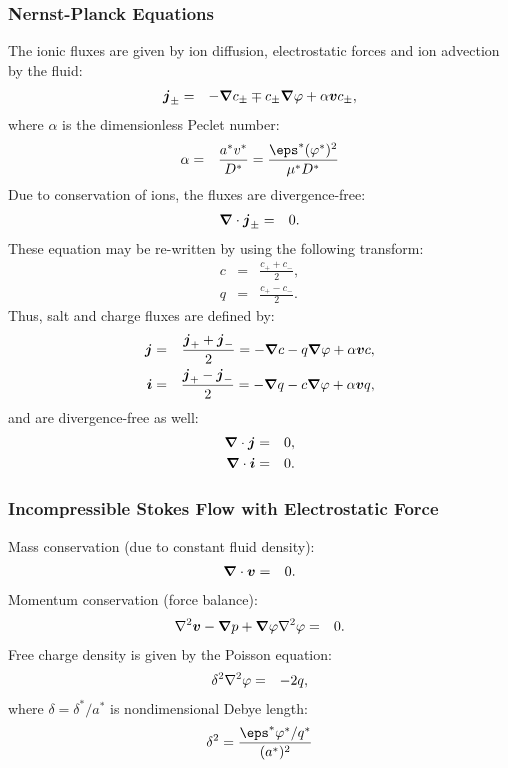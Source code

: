 \subsubsection{Nernst-Planck Equations}
The ionic fluxes are given by ion diffusion, electrostatic forces and ion advection by the fluid:
\begin{eqnarray}
  \boldsymbol{j}_\pm &=& -\boldsymbol{\nabla} c_\pm \mp c_\pm \boldsymbol{\nabla} \varphi + \alpha \boldsymbol{v} c_\pm,
\end{eqnarray}
where $\alpha$ is the dimensionless Peclet number:
\begin{eqnarray}
\alpha &=&  \frac{a^* v^*}{D^*} = \frac{\eps^* (\varphi^*)^2}{\mu^* D^*}
\end{eqnarray}
Due to conservation of ions, the fluxes are divergence-free:
\begin{eqnarray}
\boldsymbol{\nabla} \cdot \boldsymbol{j}_\pm &=& 0.
\end{eqnarray}
These equation may be re-written by using the following transform:
\begin{eqnarray}
  c &=& \frac{c_+ + c_-}{2},\\
  q &=& \frac{c_+ - c_-}{2}.
\end{eqnarray}
Thus, salt and charge fluxes are defined by:
\begin{eqnarray}
  \boldsymbol{j} &=& \frac{\boldsymbol{j}_+ + \boldsymbol{j}_-}{2} = -\boldsymbol{\nabla} c - q \boldsymbol{\nabla} \varphi + \alpha \boldsymbol{v} c, \\
  \boldsymbol{i} &=& \frac{\boldsymbol{j}_+ - \boldsymbol{j}_-}{2} = -\boldsymbol{\nabla} q - c \boldsymbol{\nabla} \varphi + \alpha \boldsymbol{v} q,
\end{eqnarray}
and are divergence-free as well:
\begin{eqnarray}
\boldsymbol{\nabla} \cdot \boldsymbol{j} &=& 0, \\
\boldsymbol{\nabla} \cdot \boldsymbol{i} &=& 0. 
\end{eqnarray}

\subsubsection{Incompressible Stokes Flow with Electrostatic Force}
Mass conservation (due to constant fluid density):
\begin{eqnarray}
\boldsymbol{\nabla} \cdot \boldsymbol{v} &=& 0.
\end{eqnarray}
Momentum conservation (force balance):
\begin{eqnarray}
\nabla^2 \boldsymbol{v} - \boldsymbol{\nabla} p + \boldsymbol{\nabla} \varphi \nabla^2 \varphi &=& 0.
\end{eqnarray}
Free charge density is given by the Poisson equation:
\begin{eqnarray}
\delta^2 \nabla^2 \varphi &=& -2q,
\end{eqnarray}
where $\delta = \delta^* / a^*$ is nondimensional Debye length:
\begin{eqnarray}
\delta^2 = \frac{\eps^* \varphi^* / q^*}{(a^*)^2}
\end{eqnarray}

